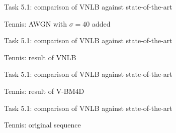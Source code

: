 \documentclass[mathserif, 8pt]{beamer}
\makeatletter
\newcounter{multipleslide}
\newcommand{\multipleframe}{%
\setcounter{multipleslide}{\value{framenumber}}
\stepcounter{multipleslide}
\patchcmd{\beamer@@tmpl@footline}%
	{\insertframenumber}%
	{\themultipleslide}%
	{}%
	{}%
}
\newcommand{\restoreframe}{%
\patchcmd{\beamer@@tmpl@footline}%
	{\themultipleslide}%
	{\insertframenumber}%
	{}%
	{}%
\setcounter{framenumber}{\value{multipleslide}}%
}
\makeatother
\begin{document}
\multipleframe
\begin{frame}{Task 5.1: comparison of VNLB against state-of-the-art}
	\begin{center}
	\end{center}
	\begin{center}
			Tennis: AWGN with $\sigma = 40$ added
	\end{center}
\end{frame}

\begin{frame}{Task 5.1: comparison of VNLB against state-of-the-art}
	\begin{center}
	\end{center}
	\begin{center}
			Tennis: result of VNLB  
	\end{center}
\end{frame}

\begin{frame}{Task 5.1: comparison of VNLB against state-of-the-art}
	\begin{center}
	\end{center}
	\begin{center}
			Tennis: result of V-BM4D
	\end{center}
\end{frame}

\begin{frame}{Task 5.1: comparison of VNLB against state-of-the-art}
	\begin{center}
	\end{center}
	\begin{center}
			Tennis: original sequence
	\end{center}
\end{frame}
\restoreframe
\end{document}
